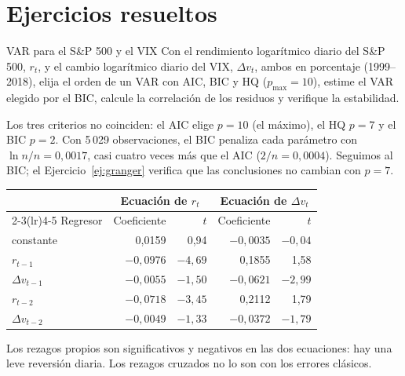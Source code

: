 \section{Ejercicios resueltos}

\begin{ejresuelto}{VAR para el S\&P 500 y el VIX}\label{ej:varvix}
\enunciado Con el rendimiento logarítmico diario del S\&P 500, $r_t$, y el cambio logarítmico diario del VIX,
$\Delta v_t$, ambos en porcentaje (1999--2018), elija el orden de un VAR con AIC, BIC y HQ ($p_{\max}=10$),
estime el VAR elegido por el BIC, calcule la correlación de los residuos y verifique la estabilidad.

\solucion
{} Los tres criterios no coinciden: el AIC elige $p=10$ (el máximo), el HQ
$p=7$ y el BIC $p=2$. Con 5\,029 observaciones, el BIC penaliza cada parámetro con $\ln n/n=0{,}0017$, casi
cuatro veces más que el AIC ($2/n=0{,}0004$). Seguimos al BIC; el Ejercicio~\ref{ej:granger} verifica que las
conclusiones no cambian con $p=7$.

\begin{center}\small
\begin{tabular}{@{}lrrrr@{}}
\toprule
 & \multicolumn{2}{c}{Ecuación de $r_t$} & \multicolumn{2}{c}{Ecuación de $\Delta v_t$} \\
\cmidrule(lr){2-3}\cmidrule(lr){4-5}
Regresor & Coeficiente & $t$ & Coeficiente & $t$ \\
\midrule
constante        & 0,0159 & 0,94 & $-0{,}0035$ & $-0{,}04$ \\
$r_{t-1}$        & $-0{,}0976$ & $-4{,}69$ & 0,1855 & 1,58 \\
$\Delta v_{t-1}$ & $-0{,}0055$ & $-1{,}50$ & $-0{,}0621$ & $-2{,}99$ \\
$r_{t-2}$        & $-0{,}0718$ & $-3{,}45$ & 0,2112 & 1,79 \\
$\Delta v_{t-2}$ & $-0{,}0049$ & $-1{,}33$ & $-0{,}0372$ & $-1{,}79$ \\
\bottomrule
\end{tabular}
\end{center}
Los rezagos propios son significativos y negativos en las dos ecuaciones: hay una leve reversión diaria. Los
rezagos cruzados no lo son con los errores clásicos.


\end{ejresuelto}
